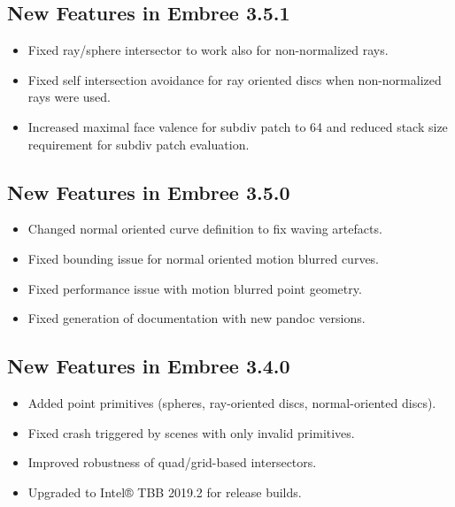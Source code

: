 \subsection{New Features in Embree
3.5.1}\label{new-features-in-embree-3.5.1}

\begin{itemize}
\tightlist
\item
  Fixed ray/sphere intersector to work also for non-normalized rays.
\item
  Fixed self intersection avoidance for ray oriented discs when
  non-normalized rays were used.
\item
  Increased maximal face valence for subdiv patch to 64 and reduced
  stack size requirement for subdiv patch evaluation.
\end{itemize}

\subsection{New Features in Embree
3.5.0}\label{new-features-in-embree-3.5.0}

\begin{itemize}
\tightlist
\item
  Changed normal oriented curve definition to fix waving artefacts.
\item
  Fixed bounding issue for normal oriented motion blurred curves.
\item
  Fixed performance issue with motion blurred point geometry.
\item
  Fixed generation of documentation with new pandoc versions.
\end{itemize}

\subsection{New Features in Embree
3.4.0}\label{new-features-in-embree-3.4.0}

\begin{itemize}
\tightlist
\item
  Added point primitives (spheres, ray-oriented discs, normal-oriented
  discs).
\item
  Fixed crash triggered by scenes with only invalid primitives.
\item
  Improved robustness of quad/grid-based intersectors.
\item
  Upgraded to Intel® TBB 2019.2 for release builds.
\end{itemize}

